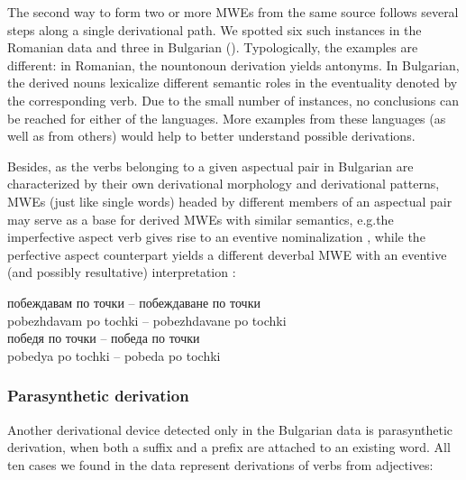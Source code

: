 \documentclass[output=paper]{langsci/langscibook}
\begin{document}

The second way to form two or more MWEs from the same source follows
several steps along a single derivational path. We spotted six such
instances in the Romanian data and three in Bulgarian ().
Typologically, the examples are different: in Romanian, the
noun\textendash to\textendash noun derivation yields antonyms. In Bulgarian, the derived
nouns lexicalize different semantic roles in the eventuality denoted by
the corresponding verb. Due to the small number of instances, no
conclusions can be reached for either of the languages. More examples
from these languages (as well as from others) would help to better
understand possible derivations. 


Besides, as the verbs belonging to a given aspectual pair in Bulgarian
are characterized by their own derivational morphology and derivational
patterns, MWEs (just like single words) headed by different members of
an aspectual pair may serve as a base for derived MWEs with similar
semantics, e.g.\@ the imperfective aspect verb gives rise to an eventive
nominalization  , while the perfective aspect counterpart yields a
different deverbal MWE with an eventive (and possibly resultative)
interpretation :



\begin{exe}
\ex \label{ex:8:13}
\settowidth{}
\begin{xlist}
\ex \label{ex:8:13a} 
\gll побеждавам по точки -- побеждаване по точки\\
pobezhdavam po tochki  -- pobezhdavane po tochki\\ 
\ex \label{ex:8:13b} 
\gll победя по точки -- победа по точки\\
pobedya po tochki  -- pobeda po tochki\\ 
\end{xlist}
\end{exe}



\subsubsection{Parasynthetic derivation}
\label{parasynthetic}

Another derivational device detected only in the Bulgarian data is
parasynthetic derivation, when both a suffix and a prefix are attached
to an existing word. All ten cases we found in the data represent
derivations of verbs from adjectives:
\end{document}
